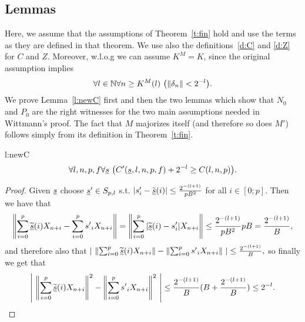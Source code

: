 \subsection{Lemmas}\label{s:Lemmas}

Here, we assume that the assumptions of Theorem~\ref{t:fin} hold and use the terms as they are defined in that theorem.
We use also the definitions~\ref{d:C} and \ref{d:Z} for $C$ and $Z$.
Moreover, w.l.o.g we can assume $K^M=K$, since the original assumption implies
\[ \forall l\in\NN\forall n\geq K^M(l) \ \big(\|\delta_n\|<2^{-l}\big). \]
We prove Lemma~\ref{l:newC} first and then the two lemmas which show 
that $N_0$ and $P_0$ are the right
witnesses for the two main assumptions needed in Wittmann's proof. The fact
that $M$ majorizes itself (and therefore so does $M'$) 
follows simply from its definition in Theorem~\ref{t:fin}.\\

\begin{lemma*}{l:newC}
\[
\forall l,n,p,f \forall \underline s\ \big( C'(\underline s,l,n,p,f)+2^{-l}\geq C(l,n,p) \big).
\]
\end{lemma*}
\begin{proof}
Given $\underline s$ choose $\underline s'\in S_{p,l}$ s.t. $|s'_i-\tilde {\underline s}(i)|\leq \frac{2^{-(l+1)}}{pB^2}$ for all $i\in[0;p]$. 
Then we have that
\begin{align*}
\left\|\sum_{i=0}^{p} \widetilde{\underline s}(i) X_{n+i} - \sum_{i=0}^{p} {s'}_i X_{n+i}\right\| = 
\left\|\sum_{i=0}^{p} |\widetilde{\underline s}(i)-s'_i| X_{n+i} \right\| \leq
\frac{2^{-(l+1)}}{pB^2}pB = \frac{2^{-(l+1)}}{B},
\end{align*}
and therefore also that
$
\left|\ \left\|\sum_{i=0}^{p} \widetilde{\tup s}(i) X_{n+i}\right\| - \left\|\sum_{i=0}^{p} {s'}_i X_{n+i}\right\| \ \right|\leq\frac{2^{-(l+1)}}{B},
$
so finally we get that
\[
\left|\ \left\|\sum_{i=0}^{p} \widetilde{\underline s}(i) X_{n+i}\right\|^2 - \left\|\sum_{i=0}^{p} {s'}_i X_{n+i}\right\|^2\  \right| \leq \frac{2^{-(l+1)}}{B} ( B + \frac{2^{-(l+1)}}{B} ) \leq 2^{-l}.
\]
\end{proof}


